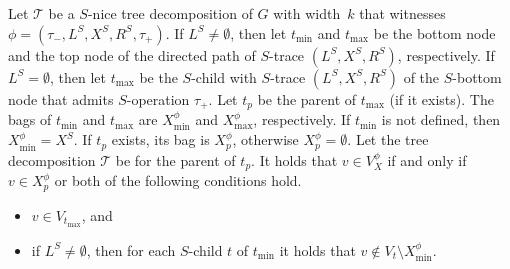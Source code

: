 \documentclass[a4paper,UKenglish,cleveref, autoref, thm-restate, numberwithinsect]{lipics-v2021}
\newcommand{\slim}{\text{slim}\xspace}
\newcommand{\topheavy}{\text{top-heavy}\xspace}
\begin{document}
\begin{lemma}\label{lem:vx}
Let $\mathcal{T}$ be a \slim $S$-nice tree decomposition of $G$ with width~$k$ that witnesses $\phi=(\tau_-,L^S, X^S, R^S,\tau_+)$. 
If $L^S\neq\emptyset$, then let $t_{\min}$ and $t_{\max}$ be the bottom node and the top node of the directed path of $S$-trace $(L^S, X^S, R^S)$, respectively. 
If $L^S=\emptyset$, then let $t_{\max}$ be the $S$-child with $S$-trace $(L^S, X^S, R^S)$ of the $S$-bottom node that admits $S$-operation $\tau_+$. 
Let $t_p$ be the parent of $t_{\max}$ (if it exists). 
The bags of $t_{\min}$ and $t_{\max}$ are $X^\phi_{\min}$ and $X^\phi_{\max}$, respectively. If $t_{\min}$ is not defined, then $X^\phi_{\min}=X^S$.
If $t_p$ exists, its bag is $X^\phi_p$, otherwise $X^\phi_p=\emptyset$.
Let the tree decomposition $\mathcal{T}$ be \topheavy for the parent of $t_p$. 
    It holds that $v\in V^\phi_X$ if and only if $v\in X^\phi_p$ or both of the following conditions hold.
    \begin{itemize}
        \item $v\in V_{t_{\max}}$, and
        \item if $L^S\neq\emptyset$, then for each $S$-child $t$ of $t_{\min}$ it holds that $v\notin V_t\setminus X^\phi_{\min}$.
    \end{itemize}
\end{lemma}
\end{document}
